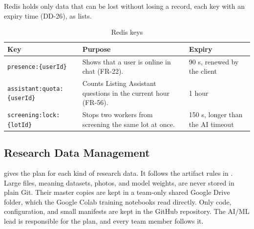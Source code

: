 Redis holds only data that can be lost without losing a record, each key with an expiry
time (DD-26), as  lists.

\begin{table}[H]
\centering
\caption{Redis keys}
\label{tab:redis-keys}
\footnotesize
\begin{tabularx}{\textwidth}{@{}p{}X p{}@{}}
\toprule
\textbf{Key} & \textbf{Purpose} & \textbf{Expiry} \\
\midrule
\texttt{presence:\{userId\}} & Shows that a user is online in chat (FR-22). & 90 s, renewed by the client \\
\texttt{assistant:quota:\allowbreak\{userId\}} & Counts Listing Assistant questions in the current hour (FR-56). & 1 hour \\
\texttt{screening:lock:\{lotId\}} & Stops two workers from screening the same lot at once. & 150 s, longer than the AI timeout \\
\bottomrule
\end{tabularx}
\end{table}

\subsection{Research Data Management }
\label{sec:research-data-management}
 gives the plan for each kind of research data. It follows
the artifact rules in . Large files, meaning datasets,
photos, and model weights, are never stored in plain Git. Their master copies are kept
in a team-only shared Google Drive folder, which the Google Colab training notebooks
read directly. Only code, configuration, and small manifests are kept in the GitHub
repository. The AI/ML lead is responsible for the plan, and every team member follows
it.

